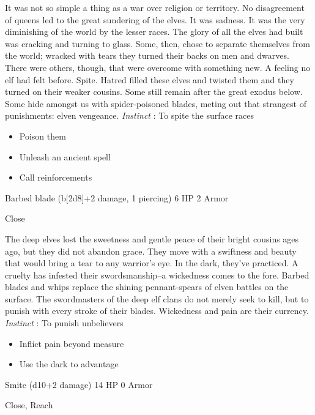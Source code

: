  It was not so simple a thing as a war over religion or territory. No disagreement of queens led to the great sundering of the elves. It was sadness. It was the very diminishing of the world by the lesser races. The glory of all the elves had built was cracking and turning to glass. Some, then, chose to separate themselves from the world; wracked with tears they turned their backs on men and dwarves. There were others, though, that were overcome with something new. A feeling no elf had felt before. Spite. Hatred filled these elves and twisted them and they turned on their weaker cousins. Some still remain after the great exodus below. Some hide amongst us with spider-poisoned blades, meting out that strangest of punishments: elven vengeance. \emph{Instinct}
: To spite the surface races
\begin{itemize}
\item Poison them
\item Unleash an ancient spell
\item Call reinforcements

\end{itemize}




 Barbed blade (b[2d8]+2 damage, 1 piercing) 6 HP 2 Armor


 Close


 The deep elves lost the sweetness and gentle peace of their bright cousins ages ago, but they did not abandon grace. They move with a swiftness and beauty that would bring a tear to any warrior's eye. In the dark, they've practiced. A cruelty has infested their swordsmanship--a wickedness comes to the fore. Barbed blades and whips replace the shining pennant-spears of elven battles on the surface. The swordmasters of the deep elf clans do not merely seek to kill, but to punish with every stroke of their blades. Wickedness and pain are their currency. \emph{Instinct}
: To punish unbelievers
\begin{itemize}
\item Inflict pain beyond measure
\item Use the dark to advantage

\end{itemize}




 Smite (d10+2 damage) 14 HP 0 Armor


 Close, Reach


